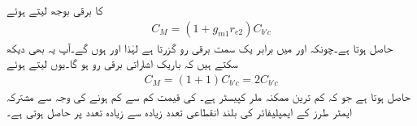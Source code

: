  کا برقی بوجھ  لیتے ہوئے
\begin{align}
C_M=\left(1+g_{m1} r_{e2} \right) C_{b'c}
\end{align}
حاصل ہوتا ہے۔چونکہ  اور  میں برابر یک سمت برقی رو  گزرتا ہے لہٰذا  اور  ہوں گے۔آپ یہ بھی دیکھ سکتے ہیں کہ باریک اشاراتی برقی رو  ہو گا۔یوں   لیتے ہوئے
\begin{align}
C_M=\left(1+1 \right) C_{b'c}=2 C_{b'c}
\end{align}
حاصل ہوتا ہے جو کہ کم ترین ممکنہ ملر کپیسٹر ہے۔ کی قیمت کم سے کم ہونے کی وجہ سے  مشترکہ ایمٹر        طرز کے ایمپلیفائر کی  بلند انقطاعی تعدد زیادہ سے زیادہ تعدد پر حاصل ہوتی ہے۔

